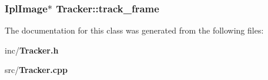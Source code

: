 \subsubsection{\setlength{\rightskip}{0pt plus 5cm}IplImage$\ast$ {\bf Tracker::track\_\-frame}\hspace{0.3cm}{\tt  [private]}}\label{classTracker_aa945cb28a2e7077145d6fc8e882294a}




The documentation for this class was generated from the following files:\begin{CompactItemize}
\item 
inc/{\bf Tracker.h}\item 
src/{\bf Tracker.cpp}\end{CompactItemize}
